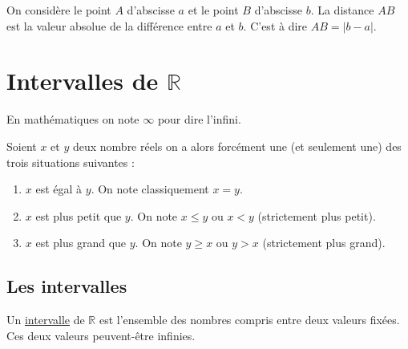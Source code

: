 \documentclass[10pt,a4paper]{book}
\newcommand{\R}{\mathbb{R}}
\begin{document}
\begin{prop} On considère le point $A$ d'abscisse $a$ 
  et le point $B$ d'abscisse $b$. La distance $AB$ est la valeur absolue de la 
  différence entre $a$ et $b$. C'est à dire $AB=|b-a|$. 
\end{prop}
  \section{Intervalles de $\R$}
  
  \begin{de}
    En mathématiques on note $\infty$ pour dire l'infini.
  \end{de}
  

  \begin{de}[Ordre]
    Soient $x$ et $y$ deux nombre réels on a alors forcément une (et seulement une) des trois situations suivantes :
    \begin{enumerate}
      \item $x$ est égal à $y$. On note classiquement $x=y$.
      \item $x$ est plus petit que $y$. On note $x\leq y$ ou $x<y$ (strictement plus petit). 
      \item $x$ est plus grand que $y$. On note $y\geq x$ ou $y>x$ (strictement plus 
      grand). 
    \end{enumerate}
  \end{de}
  
  \subsection{Les intervalles}
  
  \begin{de}[intervalle]
    Un \underline{intervalle} de $\R$ est l'ensemble des nombres compris entre deux valeurs 
    fixées. Ces deux valeurs peuvent-être infinies. 
  \end{de}
  
\end{document}
